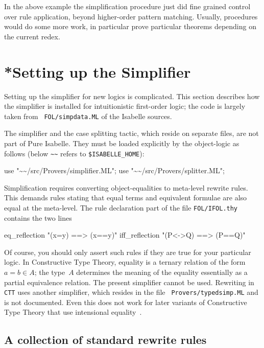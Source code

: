 \medskip

In the above example the simplification procedure just did fine
grained control over rule application, beyond higher-order pattern
matching.  Usually, procedures would do some more work, in particular
prove particular theorems depending on the current redex.


\section{*Setting up the Simplifier}\label{sec:setting-up-simp}

Setting up the simplifier for new logics is complicated.  This section
describes how the simplifier is installed for intuitionistic
first-order logic; the code is largely taken from {\tt
  FOL/simpdata.ML} of the Isabelle sources.

The simplifier and the case splitting tactic, which reside on separate files,
are not part of Pure Isabelle.  They must be loaded explicitly by the
object-logic as follows (below \texttt{\~\relax\~\relax} refers to
\texttt{\$ISABELLE_HOME}):
\begin{ttbox}
use "\~\relax\~\relax/src/Provers/simplifier.ML";
use "\~\relax\~\relax/src/Provers/splitter.ML";
\end{ttbox}

Simplification requires converting object-equalities to meta-level rewrite
rules.  This demands rules stating that equal terms and equivalent formulae
are also equal at the meta-level.  The rule declaration part of the file
\texttt{FOL/IFOL.thy} contains the two lines
\begin{ttbox}
eq_reflection   "(x=y)   ==> (x==y)"
iff_reflection  "(P<->Q) ==> (P==Q)"
\end{ttbox}
Of course, you should only assert such rules if they are true for your
particular logic.  In Constructive Type Theory, equality is a ternary
relation of the form $a=b\in A$; the type~$A$ determines the meaning
of the equality essentially as a partial equivalence relation.  The
present simplifier cannot be used.  Rewriting in \texttt{CTT} uses
another simplifier, which resides in the file {\tt
  Provers/typedsimp.ML} and is not documented.  Even this does not
work for later variants of Constructive Type Theory that use
intensional equality~\cite{nordstrom90}.


\subsection{A collection of standard rewrite rules}

